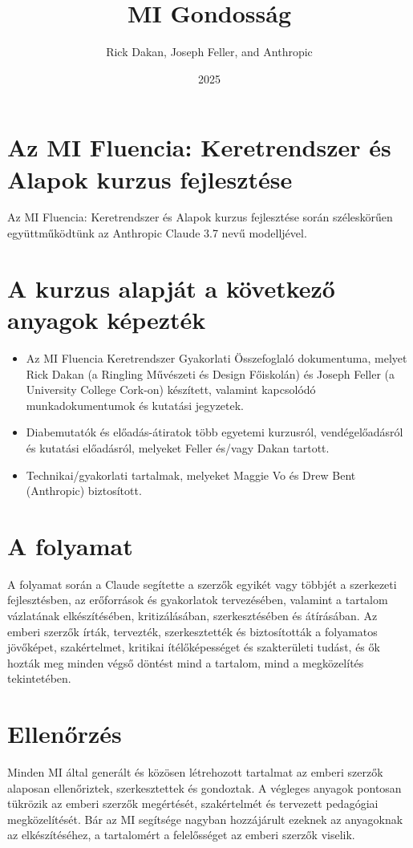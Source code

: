 \documentclass[a4paper, 12pt]{article}
\begin{document}
\title{MI Gondosság}
\author{Rick Dakan, Joseph Feller, and Anthropic}
\date{2025}
\maketitle

\section*{Az MI Fluencia: Keretrendszer és Alapok kurzus fejlesztése}
Az MI Fluencia: Keretrendszer és Alapok kurzus fejlesztése során széleskörűen együttműködtünk az Anthropic Claude 3.7 nevű modelljével.

\section*{A kurzus alapját a következő anyagok képezték}
\begin{itemize}
    \item Az MI Fluencia Keretrendszer Gyakorlati Összefoglaló dokumentuma, melyet Rick Dakan (a Ringling Művészeti és Design Főiskolán) és Joseph Feller (a University College Cork-on) készített, valamint kapcsolódó munkadokumentumok és kutatási jegyzetek.
    \item Diabemutatók és előadás-átiratok több egyetemi kurzusról, vendégelőadásról és kutatási előadásról, melyeket Feller és/vagy Dakan tartott.
    \item Technikai/gyakorlati tartalmak, melyeket Maggie Vo és Drew Bent (Anthropic) biztosított.
\end{itemize}

\section*{A folyamat}
A folyamat során a Claude segítette a szerzők egyikét vagy többjét a szerkezeti fejlesztésben, az erőforrások és gyakorlatok tervezésében, valamint a tartalom vázlatának elkészítésében, kritizálásában, szerkesztésében és átírásában. Az emberi szerzők írták, tervezték, szerkesztették és biztosították a folyamatos jövőképet, szakértelmet, kritikai ítélőképességet és szakterületi tudást, és ők hozták meg minden végső döntést mind a tartalom, mind a megközelítés tekintetében.

\section*{Ellenőrzés}
Minden MI által generált és közösen létrehozott tartalmat az emberi szerzők alaposan ellenőriztek, szerkesztettek és gondoztak. A végleges anyagok pontosan tükrözik az emberi szerzők megértését, szakértelmét és tervezett pedagógiai megközelítését. Bár az MI segítsége nagyban hozzájárult ezeknek az anyagoknak az elkészítéséhez, a tartalomért a felelősséget az emberi szerzők viselik.
\end{document}
